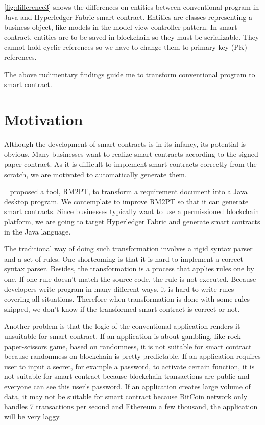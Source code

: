 \autoref{fig:difference3} shows the differences on entities between conventional program in Java and Hyperledger Fabric smart contract.
Entities are classes representing a business object, like models in the model-view-controller pattern.
In smart contract, entities are to be saved in blockchain so they must be serializable. They cannot hold cyclic references so we have to change them to primary key (PK) references.

The above rudimentary findings guide me to transform conventional program to smart contract.

\section{Motivation}


Although the development of smart contracts is in its infancy, its potential is obvious. Many businesses want to realize smart contracts according to the signed paper contract.
As it is difficult to implement smart contracts correctly from the scratch,
we are motivated to automatically generate them.

~\cite{yang2019automated} proposed a tool, RM2PT, to transform a requirement document into a Java desktop program.
We contemplate to improve RM2PT so that it can generate smart contracts.
Since businesses typically want to use a permissioned blockchain platform, we are going to target Hyperledger Fabric and generate smart contracts in the Java language.


The traditional way of doing such transformation involves a rigid syntax parser and a set of rules.
One shortcoming is that it is hard to implement a correct syntax parser.
Besides, the transformation is a process that applies rules one by one. If one rule doesn't match the source code, the rule is not executed.
Because developers write program in many different ways, it is hard to write rules covering all situations.
Therefore when transformation is done with some rules skipped, we don't know if the transformed smart contract is correct or not.

Another problem is that the logic of the conventional application renders it unsuitable for smart contract.
If an application is about gambling, like rock-paper-scissors game, based on randomness, it is not suitable for smart contract
because randomness on blockchain is pretty predictable.
If an application requires user to input a secret, for example a password, to activate certain function,
it is not suitable for smart contract because blockchain transactions are public and everyone can see this user's password.
If an application creates large volume of data, it may not be suitable for smart contract
because BitCoin network only handles 7 transactions per second and Ethereum a few thousand, the application will be very laggy.


